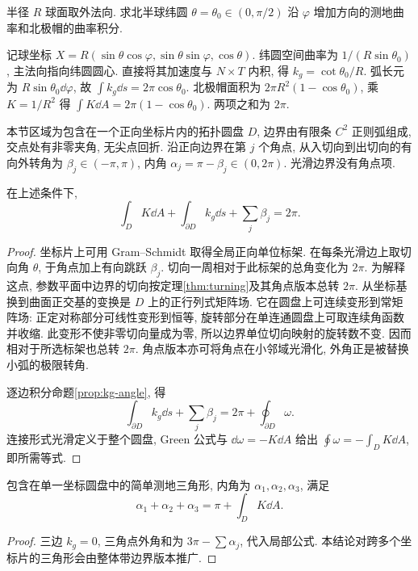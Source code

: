 \begin{example}
半径 $R$ 球面取外法向. 求北半球纬圆 $\theta=\theta_0\in(0,\pi/2)$ 沿 $\varphi$ 增加方向的测地曲率和北极帽的曲率积分.
\end{example}
\begin{solution}
记球坐标 $X=R(\sin\theta\cos\varphi,\sin\theta\sin\varphi,\cos\theta)$. 纬圆空间曲率为 $1/(R\sin\theta_0)$, 主法向指向纬圆圆心. 直接将其加速度与 $N\times T$ 内积, 得 $k_g=\cot\theta_0/R$. 弧长元为 $R\sin\theta_0\dd\varphi$, 故 $\int k_g\dd s=2\pi\cos\theta_0$. 北极帽面积为 $2\pi R^2(1-\cos\theta_0)$, 乘 $K=1/R^2$ 得 $\int K\dd A=2\pi(1-\cos\theta_0)$. 两项之和为 $2\pi$.
\end{solution}
本节区域为包含在一个正向坐标片内的拓扑圆盘 $D$, 边界由有限条 $C^2$ 正则弧组成, 交点处有非零夹角, 无尖点回折. 沿正向边界在第 $j$ 个角点, 从入切向到出切向的有向外转角为 $\beta_j\in(-\pi,\pi)$, 内角 $\alpha_j=\pi-\beta_j\in(0,2\pi)$. 光滑边界没有角点项.
\begin{theorem}\label{thm:local-gb}
在上述条件下,
\begin{equation}\label{eq:local-gb}
 \int_DK\dd A+\int_{\partial D}k_g\dd s+\sum_j\beta_j=2\pi.
\end{equation}
\end{theorem}
\begin{proof}
坐标片上可用 Gram--Schmidt 取得全局正向单位标架. 在每条光滑边上取切向角 $\theta$, 于角点加上有向跳跃 $\beta_j$. 切向一周相对于此标架的总角变化为 $2\pi$. 为解释这点, 参数平面中边界的切向按定理\ref{thm:turning}及其角点版本总转 $2\pi$. 从坐标基换到曲面正交基的变换是 $D$ 上的正行列式矩阵场. 它在圆盘上可连续变形到常矩阵场: 正定对称部分可线性变形到恒等, 旋转部分在单连通圆盘上可取连续角函数并收缩. 此变形不使非零切向量成为零, 所以边界单位切向映射的旋转数不变. 因而相对于所选标架也总转 $2\pi$. 角点版本亦可将角点在小邻域光滑化, 外角正是被替换小弧的极限转角.

逐边积分命题\ref{prop:kg-angle}, 得
\[
 \int_{\partial D}k_g\dd s+\sum_j\beta_j
 =2\pi+\oint_{\partial D}\omega.
\]
连接形式光滑定义于整个圆盘, Green 公式与 $\dd\omega=-K\dd A$ 给出 $\oint\omega=-\int_DK\dd A$, 即所需等式.
\end{proof}
\begin{corollary}[测地三角形]\label{cor:triangle}
包含在单一坐标圆盘中的简单测地三角形, 内角为 $\alpha_1,\alpha_2,\alpha_3$, 满足
\[
 \alpha_1+\alpha_2+\alpha_3=\pi+\int_DK\dd A.
\]
\end{corollary}
\begin{proof}
三边 $k_g=0$, 三角点外角和为 $3\pi-\sum\alpha_j$, 代入局部公式. 本结论对跨多个坐标片的三角形会由整体带边界版本推广.
\end{proof}
